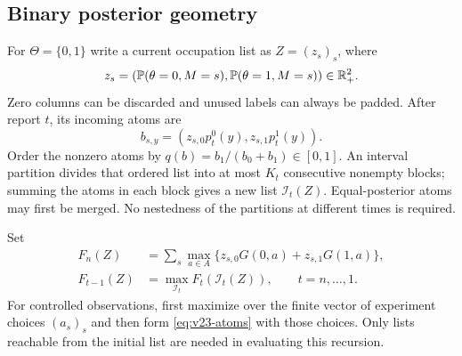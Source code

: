 \subsection{Binary posterior geometry}
For $\Theta=\{0,1\}$ write a current occupation list as
$Z=(z_s)_s$, where
\[
 z_s=(\mathbb P(\theta=0,M=s),\mathbb P(\theta=1,M=s))\in\mathbb R_+^2.
\]
Zero columns can be discarded and unused labels can always be padded.
After report $t$, its incoming atoms are
\begin{equation}\label{eq:v23-atoms}
 b_{s,y}=(z_{s,0}p_t^0(y),z_{s,1}p_t^1(y)).
\end{equation}
Order the nonzero atoms by
$q(b)=b_1/(b_0+b_1)\in[0,1]$. An interval partition divides that ordered
list into at most $K_t$ consecutive nonempty blocks; summing the atoms
in each block gives a new list $\mathcal I_t(Z)$. Equal-posterior atoms
may first be merged. No nestedness of the partitions at different times
is required.

Set
\begin{equation}\label{eq:v23-posterior-dp}
 \begin{split}
 F_n(Z)&=\sum_s\max_{a\in A}
                        \{z_{s,0}G(0,a)+z_{s,1}G(1,a)\},\\
 F_{t-1}(Z)&=\max_{\mathcal I_t}F_t(\mathcal I_t(Z)),
                              \qquad t=n,\ldots,1.
 \end{split}
\end{equation}
For controlled observations, first maximize over the finite vector of
experiment choices $(a_s)_s$ and then form
\eqref{eq:v23-atoms} with those choices. Only lists reachable from the
initial list are needed in evaluating this recursion.

